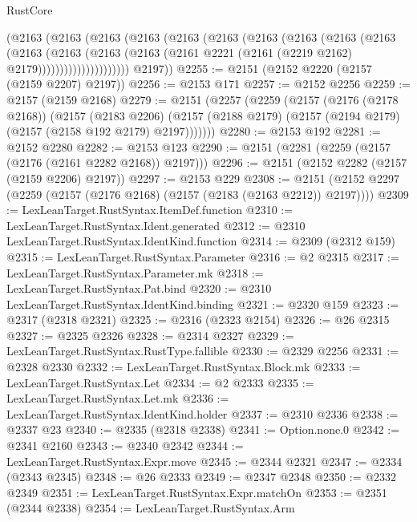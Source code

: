 \begin{lexlean}{RustCore}
\begin{coremodule}
                  (@2163
                    (@2163
                      (@2163
                        (@2163
                          (@2163
                            (@2163
                              (@2163
                                (@2163
                                  (@2163
                                    (@2163
                                      (@2163
                                        (@2163
                                          (@2163
                                            (@2163
                                              (@2161
                                                @2221
                                                (@2161 (@2219 @2162) @2179)))))))))))))))))))))
        @2197))
@2255 := @2151 (@2152 @2220 (@2157 (@2159 @2207) @2197))
@2256 := @2153 @171
@2257 := @2152 @2256
@2259 := @2157 (@2159 @2168)
@2279 := @2151
    (@2257
      (@2259
        (@2157
          (@2176 (@2178 @2168))
          (@2157
            (@2183 @2206)
            (@2157 (@2188 @2179) (@2157 (@2194 @2179) (@2157 (@2158 @192 @2179) @2197)))))))
@2280 := @2153 @192
@2281 := @2152 @2280
@2282 := @2153 @123
@2290 := @2151 (@2281 (@2259 (@2157 (@2176 (@2161 @2282 @2168)) @2197)))
@2296 := @2151 (@2152 @2282 (@2157 (@2159 @2206) @2197))
@2297 := @2153 @229
@2308 := @2151 (@2152 @2297 (@2259 (@2157 (@2176 @2168) (@2157 (@2183 (@2163 @2212)) @2197))))
@2309 := LexLeanTarget.RustSyntax.ItemDef.function
@2310 := LexLeanTarget.RustSyntax.Ident.generated
@2312 := @2310 LexLeanTarget.RustSyntax.IdentKind.function
@2314 := @2309 (@2312 @159)
@2315 := LexLeanTarget.RustSyntax.Parameter
@2316 := @2 @2315
@2317 := LexLeanTarget.RustSyntax.Parameter.mk
@2318 := LexLeanTarget.RustSyntax.Pat.bind
@2320 := @2310 LexLeanTarget.RustSyntax.IdentKind.binding
@2321 := @2320 @159
@2323 := @2317 (@2318 @2321)
@2325 := @2316 (@2323 @2154)
@2326 := @26 @2315
@2327 := @2325 @2326
@2328 := @2314 @2327
@2329 := LexLeanTarget.RustSyntax.RustType.fallible
@2330 := @2329 @2256
@2331 := @2328 @2330
@2332 := LexLeanTarget.RustSyntax.Block.mk
@2333 := LexLeanTarget.RustSyntax.Let
@2334 := @2 @2333
@2335 := LexLeanTarget.RustSyntax.Let.mk
@2336 := LexLeanTarget.RustSyntax.IdentKind.holder
@2337 := @2310 @2336
@2338 := @2337 @23
@2340 := @2335 (@2318 @2338)
@2341 := Option.none.{0}
@2342 := @2341 @2160
@2343 := @2340 @2342
@2344 := LexLeanTarget.RustSyntax.Expr.move
@2345 := @2344 @2321
@2347 := @2334 (@2343 @2345)
@2348 := @26 @2333
@2349 := @2347 @2348
@2350 := @2332 @2349
@2351 := LexLeanTarget.RustSyntax.Expr.matchOn
@2353 := @2351 (@2344 @2338)
@2354 := LexLeanTarget.RustSyntax.Arm

\end{coremodule}
\end{lexlean}
